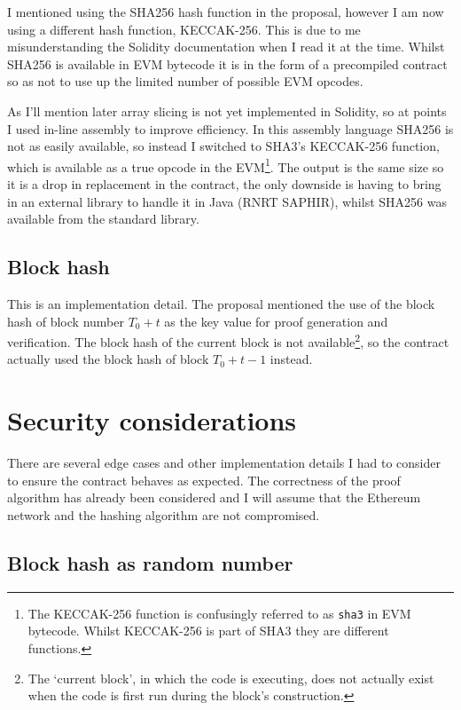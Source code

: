 \documentclass[12pt,a4paper,twoside,openright]{report}
\begin{document}
I mentioned using the SHA256 hash function in the proposal, however I am now using a different hash function, KECCAK-256.
This is due to me misunderstanding the Solidity documentation when I read it at the time.
Whilst SHA256 is available in EVM bytecode it is in the form of a precompiled contract
so as not to use up the limited number of possible EVM opcodes.

As I'll mention later array slicing is not yet implemented in Solidity, so at points I used in-line assembly to improve efficiency.
In this assembly language SHA256 is not as easily available, so instead I switched to SHA3's KECCAK-256 function, which is available as a true opcode in the EVM\footnote{
The KECCAK-256 function is confusingly referred to as \texttt{sha3} in EVM bytecode. Whilst KECCAK-256 is part of SHA3 they are different functions.}.
The output is the same size so it is a drop in replacement in the contract, the only downside is having to bring in an external library
to handle it in Java (RNRT SAPHIR), whilst SHA256 was available from the standard library.

\subsection{Block hash}

This is an implementation detail. The proposal mentioned the use of the block hash of block number $T_0 + t$ as the key value for proof generation and verification.
The block hash of the current block is not available\footnote{
The `current block', in which the code is executing, does not actually exist
when the code is first run during the block's construction.}, so the contract actually used the block hash of block $T_0 + t - 1$ instead.



\section{Security considerations}

There are several edge cases and other implementation details I had to consider to ensure the contract behaves as expected.
The correctness of the proof algorithm has already been considered and
I will assume that the Ethereum network and the hashing algorithm are not compromised.

\subsection{Block hash as random number} \label{sec-block-hash}
\end{document}
